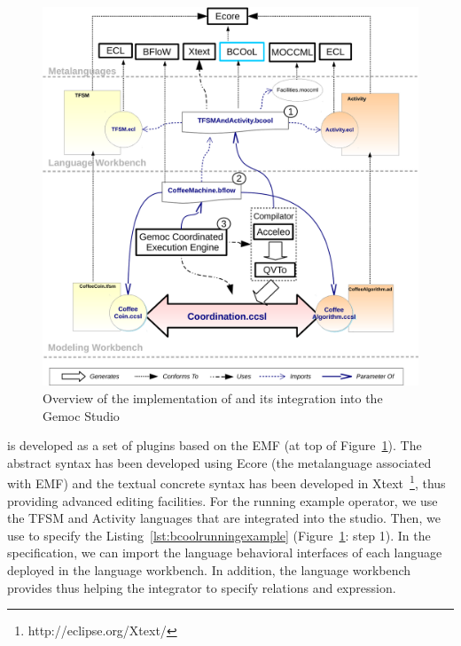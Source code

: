 \begin{figure}[]
	\begin{center}
		\includegraphics[width=1\textwidth]{bcool/figs/bcooltechnos}
		\caption{Overview of the implementation of \bcool and its integration into the Gemoc Studio}
		\label{fig:bcooltechnos}
	\end{center}
\end{figure}

\bcool is developed as a set of plugins based on the EMF (at top of Figure~\ref{fig:bcooltechnos}). The \bcool abstract syntax has been developed using Ecore (\ie the metalanguage associated with EMF) and the textual concrete syntax has been developed in Xtext~\footnote{http://eclipse.org/Xtext/}, thus providing advanced editing facilities. For the running example operator, we use the TFSM and Activity languages that are integrated into the studio. Then, we use \bcool to specify the Listing~\ref{lst:bcoolrunningexample} (Figure~\ref{fig:bcooltechnos}: step 1). In the \bcool specification, we can import the language behavioral interfaces of each language deployed in the language workbench. In addition, the language workbench provides \moccml thus helping the integrator to specify relations and expression.      


